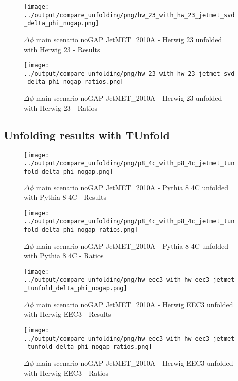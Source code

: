 \documentclass[11pt]{book}
\begin{document}
\begin{figure}[ht]
\centering
\texttt{[image: ../output/compare\_unfolding/png/hw\_23\_with\_hw\_23\_jetmet\_svd\_delta\_phi\_nogap.png]}
\caption{$\Delta\phi$ main scenario noGAP JetMET\_2010A - Herwig 23 unfolded with Herwig 23 - Results}
\label{hw_23_hw_23_jetmet_svd_delta_phi_nogap_a}
\end{figure}

\begin{figure}[ht]
\centering
\texttt{[image: ../output/compare\_unfolding/png/hw\_23\_with\_hw\_23\_jetmet\_svd\_delta\_phi\_nogap\_ratios.png]}
\caption{$\Delta\phi$ main scenario noGAP JetMET\_2010A - Herwig 23 unfolded with Herwig 23 - Ratios}
\label{hw_23_hw_23_jetmet_svd_delta_phi_nogap_b}
\end{figure}


\clearpage
\subsection{Unfolding results with TUnfold}

\begin{figure}[ht]
\centering
\texttt{[image: ../output/compare\_unfolding/png/p8\_4c\_with\_p8\_4c\_jetmet\_tunfold\_delta\_phi\_nogap.png]}
\caption{$\Delta\phi$ main scenario noGAP JetMET\_2010A - Pythia 8 4C unfolded with Pythia 8 4C - Results}
\label{p8_p8_jetmet_tunfold_delta_phi_nogap_a}
\end{figure}

\begin{figure}[ht]
\centering
\texttt{[image: ../output/compare\_unfolding/png/p8\_4c\_with\_p8\_4c\_jetmet\_tunfold\_delta\_phi\_nogap\_ratios.png]}
\caption{$\Delta\phi$ main scenario noGAP JetMET\_2010A - Pythia 8 4C unfolded with Pythia 8 4C - Ratios}
\label{p8_p8_jetmet_tunfold_delta_phi_nogap_b}
\end{figure}

\begin{figure}[ht]
\centering
\texttt{[image: ../output/compare\_unfolding/png/hw\_eec3\_with\_hw\_eec3\_jetmet\_tunfold\_delta\_phi\_nogap.png]}
\caption{$\Delta\phi$ main scenario noGAP JetMET\_2010A - Herwig EEC3 unfolded with Herwig EEC3 - Results}
\label{hw_eec3_hw_eec3_jetmet_tunfold_delta_phi_nogap_a}
\end{figure}

\begin{figure}[ht]
\centering
\texttt{[image: ../output/compare\_unfolding/png/hw\_eec3\_with\_hw\_eec3\_jetmet\_tunfold\_delta\_phi\_nogap\_ratios.png]}
\caption{$\Delta\phi$ main scenario noGAP JetMET\_2010A - Herwig EEC3 unfolded with Herwig EEC3 - Ratios}
\label{hw_eec3_hw_eec3_jetmet_tunfold_delta_phi_nogap_b}
\end{figure}
\end{document}
